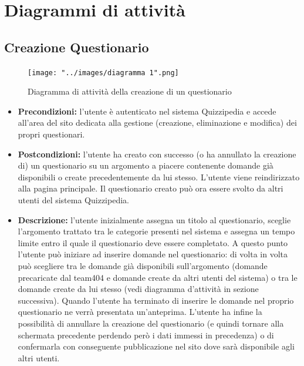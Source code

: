 \rigaregistro{0.0.17}{Luca Alessio (Progettista)}{12/05/2016}{Termine stesura sezione diagrammi e revisione/ampliamento di vari paragrafi}\documentclass[a4paper,11pt]{article}
\begin{document}
	\section{Diagrammi di attività}
	
\subsection{Creazione Questionario}
\begin{figure}[h!]
\begin{center}
	\centerline{\texttt{[image: "../images/diagramma 1".png]}}
	\caption{Diagramma di attività della creazione di un questionario}
\end{center}
\end{figure}
\begin{itemize}
\item\textbf{Precondizioni:} l'utente è autenticato nel sistema Quizzipedia e accede all'area del sito dedicata alla gestione (creazione, eliminazione e modifica) dei propri questionari.
\item\textbf{Postcondizioni:} l'utente ha creato con successo (o ha annullato la creazione di) un questionario su un argomento a piacere contenente domande già disponibili o create precedentemente da lui stesso. L'utente viene reindirizzato alla pagina principale. Il questionario creato può ora essere svolto da altri utenti del sistema Quizzipedia. %
\item\textbf{Descrizione:} l'utente inizialmente assegna un titolo al questionario, sceglie l'argomento trattato tra le categorie presenti nel sistema e assegna un tempo limite entro il quale il questionario deve essere completato. A questo punto l'utente può iniziare ad inserire domande nel questionario: di volta in volta può scegliere tra le domande già disponibili sull'argomento (domande precaricate dal team404 e domande create da altri utenti del sistema) o tra le domande create da lui stesso (vedi diagramma d'attività in sezione successiva). Quando l'utente ha terminato di inserire le domande nel proprio questionario ne verrà presentata un'anteprima. L'utente ha infine la possibilità di annullare la creazione del questionario (e quindi tornare alla schermata precedente perdendo però i dati immessi in precedenza) o di confermarla con conseguente pubblicazione nel sito dove sarà disponibile agli altri utenti.
\end{itemize}

\newpage
\end{document}

